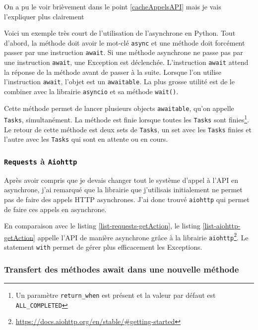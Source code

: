 \documentclass[a4paper,14pt]{extarticle}
\begin{document}
{On a pu le voir brièvement dans le point \ref{cacheAppelsAPI} mais je vais l'expliquer plus clairement


Voici un exemple très court de l'utilisation de l'asynchrone en Python. Tout d'abord, la méthode doit avoir le mot-clé \texttt{async} et une méthode doit forcément passer par une instruction \texttt{await}. Si une méthode asynchrone ne passe pas par une instruction \texttt{await}, une Exception est déclenchée. L'instruction \texttt{await} attend la réponse de la méthode avant de passer à la suite. Lorsque l'on utilise l'instruction \texttt{await}, l'objet est un \texttt{awaitable}.
La plus grosse utilité est de le combiner avec la librairie \texttt{asyncio} et sa méthode \texttt{wait()}.


Cette méthode permet de lancer plusieurs objects \texttt{awaitable}, qu'on appelle \texttt{Tasks}, simultanément. La méthode est finie lorsque toutes les \texttt{Tasks} sont finies\footnote{Un paramètre \texttt{return\_when} est présent et la valeur par défaut est \texttt{ALL\_COMPLETED}}. Le retour de cette méthode est deux sets de \texttt{Tasks}, un set avec les \texttt{Tasks} finies et l'autre avec les \texttt{Tasks} qui sont en attente ou en cours.

\subsubsection{\texttt{Requests} à \texttt{Aiohttp}}

Après avoir compris que je devais changer tout le système d'appel à l'API en asynchrone, j'ai remarqué que la librairie que j'utilisais initialement ne permet pas de faire des appels HTTP asynchrones. J'ai donc trouvé \texttt{aiohttp} qui permet de faire ces appels en asynchrone.


En comparaison avec le listing \ref{list-requests-getAction}, le listing \ref{list-aiohttp-getAction} appelle l'API de manière asynchrone grâce à la librairie \texttt{aiohttp}\footnote{\url{https://docs.aiohttp.org/en/stable/\#getting-started}}. Le statement \texttt{with} permet de gérer plus efficacement les Exceptions.

\subsubsection{Transfert des méthodes await dans une nouvelle méthode}

}
\end{document}
